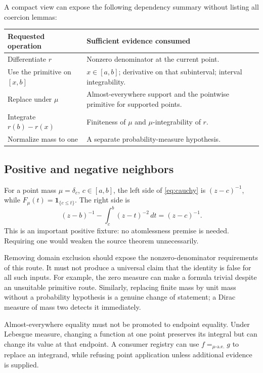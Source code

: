 \documentclass[11pt,a4paper]{article}
\numberwithin{equation}{section}
\theoremstyle{definition}\newtheorem{definition}[theorem]{Definition}
\theoremstyle{remark}\newtheorem{remark}[theorem]{Remark}
\begin{document}
A compact view can expose the following dependency summary without listing
all coercion lemmas:
\begin{center}\small
\begin{tabularx}{\textwidth}{@{}P{35mm}Y@{}}\toprule
Requested operation & Sufficient evidence consumed\\\midrule
Differentiate \(r\) & Nonzero denominator at the current point.\\
Use the primitive on \([x,b]\) & \(x\in[a,b]\); derivative on that subinterval; interval integrability.\\
Replace under \(\mu\) & Almost-everywhere support and the pointwise primitive for supported points.\\
Integrate \(r(b)-r(x)\) & Finiteness of \(\mu\) and \(\mu\)-integrability of \(r\).\\
Normalize mass to one & A separate probability-measure hypothesis.\\\bottomrule
\end{tabularx}
\end{center}

\subsection{Positive and negative neighbors}
For a point mass \(\mu=\delta_c\), \(c\in[a,b]\), the left side of
\eqref{eq:cauchy} is \((z-c)^{-1}\), while
\(F_\mu(t)=\mathbf1_{\{c\le t\}}\). The right side is
\[
 (z-b)^{-1}-\int_c^b(z-t)^{-2}\,dt=(z-c)^{-1}.
\]
This is an important positive fixture: no atomlessness premise is needed.
Requiring one would weaken the source theorem unnecessarily.

Removing domain exclusion should expose the nonzero-denominator requirements
of this route. It must not produce a universal claim that the identity is
false for all such inputs. For example, the zero measure can make a formula
trivial despite an unsuitable primitive route. Similarly, replacing finite
mass by unit mass without a probability hypothesis is a genuine change of
statement; a Dirac measure of mass two detects it immediately.

Almost-everywhere equality must not be promoted to endpoint equality. Under
Lebesgue measure, changing a function at one point preserves its integral but
can change its value at that endpoint. A consumer registry can use
\(f=_{\mu\text{-a.e.}}g\) to replace an integrand, while refusing point
application unless additional evidence is supplied.
\end{document}

